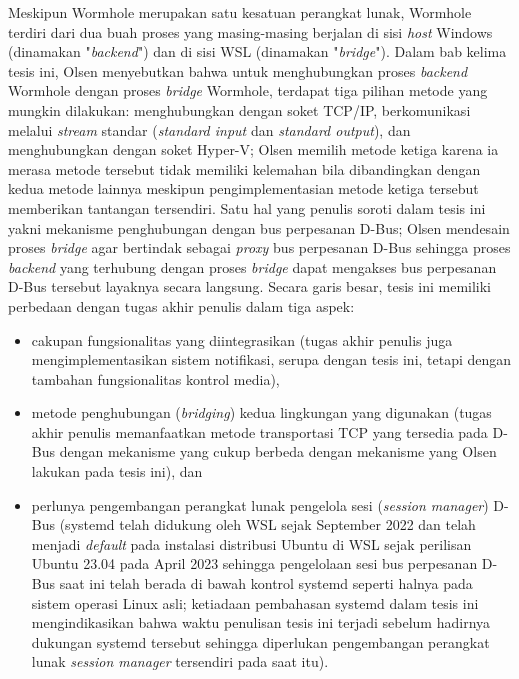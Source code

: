 Meskipun Wormhole merupakan satu kesatuan perangkat lunak, Wormhole terdiri dari dua buah proses yang masing-masing berjalan di sisi \textit{host} Windows (dinamakan "\textit{backend}") dan di sisi WSL (dinamakan "\textit{bridge}"). Dalam bab kelima tesis ini, Olsen menyebutkan bahwa untuk menghubungkan proses \textit{backend} Wormhole dengan proses \textit{bridge} Wormhole, terdapat tiga pilihan metode yang mungkin dilakukan: menghubungkan dengan soket TCP/IP, berkomunikasi melalui \textit{stream} standar (\textit{standard input} dan \textit{standard output}), dan menghubungkan dengan soket Hyper-V; Olsen memilih metode ketiga karena ia merasa metode tersebut tidak memiliki kelemahan bila dibandingkan dengan kedua metode lainnya meskipun pengimplementasian metode ketiga tersebut memberikan tantangan tersendiri. Satu hal yang penulis soroti dalam tesis ini yakni mekanisme penghubungan dengan bus perpesanan D-Bus; Olsen mendesain proses \textit{bridge} agar bertindak sebagai \textit{proxy} bus perpesanan D-Bus sehingga proses \textit{backend} yang terhubung dengan proses \textit{bridge} dapat mengakses bus perpesanan D-Bus tersebut layaknya secara langsung. Secara garis besar, tesis ini memiliki perbedaan dengan tugas akhir penulis dalam tiga aspek:
\begin{itemize}
    \item cakupan fungsionalitas yang diintegrasikan (tugas akhir penulis juga mengimplementasikan sistem notifikasi, serupa dengan tesis ini, tetapi dengan tambahan fungsionalitas kontrol media),
    \item metode penghubungan (\textit{bridging}) kedua lingkungan yang digunakan (tugas akhir penulis memanfaatkan metode transportasi TCP yang tersedia pada D-Bus dengan mekanisme yang cukup berbeda dengan mekanisme yang Olsen lakukan pada tesis ini), dan
    \item perlunya pengembangan perangkat lunak pengelola sesi (\textit{session manager}) D-Bus (systemd telah didukung oleh WSL sejak September 2022 \cite{systemd-support-is-now-available-in-wsl} dan telah menjadi \textit{default} pada instalasi distribusi Ubuntu di WSL sejak perilisan Ubuntu 23.04 pada April 2023 \cite{ubuntu-2304-release-roundup-systemd-now-becomes-default-for-ubuntu-on-wsl} sehingga pengelolaan sesi bus perpesanan D-Bus saat ini telah berada di bawah kontrol systemd seperti halnya pada sistem operasi Linux asli; ketiadaan pembahasan systemd dalam tesis ini mengindikasikan bahwa waktu penulisan tesis ini terjadi sebelum hadirnya dukungan systemd tersebut sehingga diperlukan pengembangan perangkat lunak \textit{session manager} tersendiri pada saat itu).
\end{itemize}

